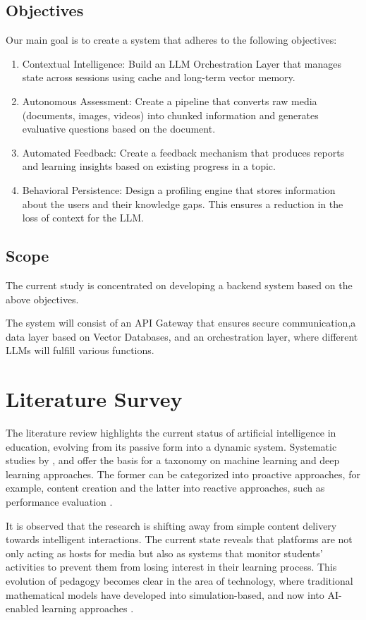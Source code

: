 \documentclass[conference]{IEEEtran}
\begin{document}
\subsection{Objectives}
Our main goal is to create a system that adheres to the following objectives:
\begin{enumerate}
	\item Contextual Intelligence: Build an LLM Orchestration Layer that manages state across sessions using cache and long-term vector memory.
	\item Autonomous Assessment: Create a pipeline that converts raw media (documents, images, videos) into chunked information and generates evaluative questions based on the document.
	\item Automated Feedback: Create a feedback mechanism that produces reports and learning insights based on existing progress in a topic.
	\item Behavioral Persistence: Design a profiling engine that stores information about the users and their knowledge gaps. This ensures a reduction in the loss of context for the LLM.
\end{enumerate}

\subsection{Scope}
The current study is concentrated on developing a backend system based on the above objectives.

The system will consist of an API Gateway that ensures secure communication,a data layer based on Vector Databases, and an orchestration layer, where different LLMs will fulfill various functions.


\section{Literature Survey}

The literature review highlights the current status of artificial intelligence in education, evolving from its passive form into a dynamic system. Systematic studies by \textcite{chen2020}, \textcite{elbasi2025} and \textcite{agbewali2022} offer the basis for a taxonomy on machine learning and deep learning approaches. The former can be categorized into proactive approaches, for example, content creation and the latter into reactive approaches, such as performance evaluation \cite{mallik2023}. 

It is observed that the research is shifting away from simple content delivery towards intelligent interactions. The current state reveals that platforms are not only acting as hosts for media but also as systems that monitor students' activities to prevent them from losing interest in their learning process. This evolution of pedagogy becomes clear in the area of technology, where traditional mathematical models have developed into simulation-based, and now into AI-enabled learning approaches \cite{lopez2025, boldo2024}.
\end{document}
